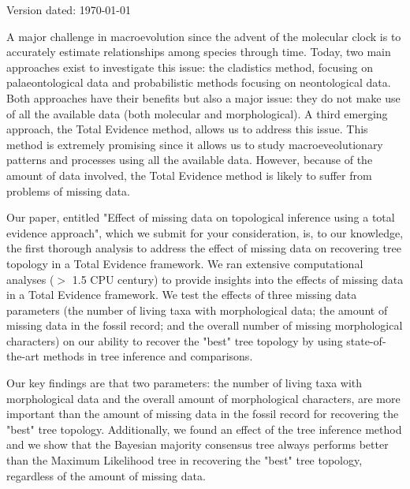 \documentclass[a4paper,11pt]{article}
\begin{document}
\begin{flushright}
Version dated: \today
\end{flushright}


A major challenge in macroevolution since the advent of the molecular clock is to accurately estimate relationships among species through time. Today, two main approaches exist to investigate this issue: the cladistics method, focusing on palaeontological data and probabilistic methods focusing on neontological data. Both approaches have their benefits but also a major issue: they do not make use of all the available data (both molecular and morphological). A third emerging approach, the Total Evidence method, allows us to address this issue. This method is extremely promising since it allows us to study macroeveolutionary patterns and processes using all the available data. However, because of the amount of data involved, the Total Evidence method is likely to suffer from problems of missing data.

Our paper, entitled "Effect of missing data on topological inference using a total evidence approach", which we submit for your consideration, is, to our knowledge, the first thorough analysis to address the effect of missing data on recovering tree topology in a Total Evidence framework. We ran extensive computational analyses ($>$ 1.5 CPU century) %
to provide insights into the effects of missing data in a Total Evidence framework. We test the effects of three missing data parameters (the number of living taxa with morphological data; the amount of missing data in the fossil record; and the overall number of missing morphological characters) on our ability to recover the "best" tree topology by using state-of-the-art methods in tree inference and comparisons.

Our key findings are that two parameters: the number of living taxa with morphological data and the overall amount of morphological characters, are more important than the amount of missing data in the fossil record for recovering the "best" tree topology. Additionally, we found an effect of the tree inference method and we show that the Bayesian majority consensus tree always performs better than the Maximum Likelihood tree in recovering the "best" tree topology, regardless of the amount of missing data.
\end{document}

